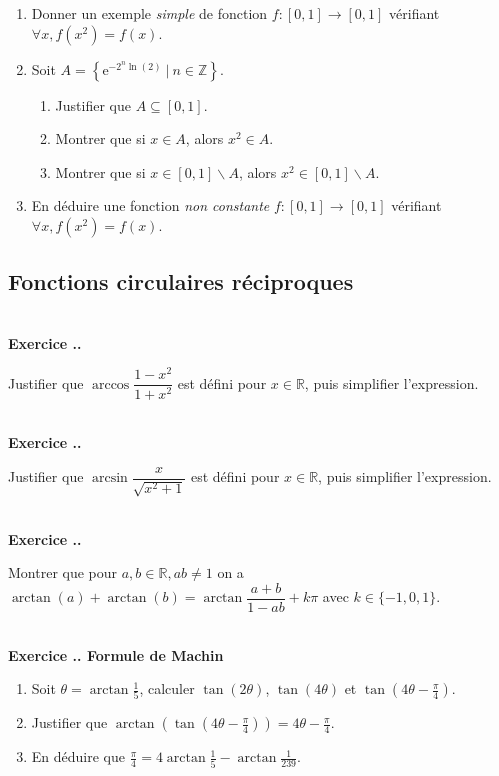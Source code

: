 \documentclass{article}
\newcommand{\mb}[1]{\mathbb{#1}}
\newcounter{exo}
\newcommand{\exercice}[1][\null]{\textbf{\\ Exercice \thesection.\theexo. #1} \addtocounter{exo}{1}}
\begin{document}
\begin{enumerate}

\item Donner un exemple \emph{simple} de fonction $f:[0,1] \rightarrow [0,1]$ vérifiant $\forall x, f(x^2) = f(x)$.
\item Soit $\displaystyle A = \left\{\text{e}^{-2^n\ln(2)}~\Big|~n \in \mb{Z}\right\}$.

\begin{enumerate}

\item Justifier que $A \subseteq[0,1]$.

\item Montrer que si $x \in A$, alors $x^2 \in A$.

\item Montrer que si $x \in [0,1]\smallsetminus A$, alors $x^2 \in [0,1]\smallsetminus A$.

\end{enumerate}

\item En déduire une fonction \emph{non constante} $f:[0,1] \rightarrow [0,1]$ vérifiant $\forall x, f(x^2) = f(x)$.
\end{enumerate}


        
\subsection{Fonctions circulaires réciproques}

\exercice

Justifier que $\arccos \dfrac{1-x^2}{1+x^2}$ est défini pour $x \in \mb{R}$, puis simplifier l'expression.

\exercice

Justifier que $\arcsin \dfrac{x}{\sqrt{x^2 +1}}$ est défini pour $x \in \mb{R}$, puis simplifier l'expression.




\exercice

Montrer que pour $a,b \in \mb{R}, ab \neq 1$ on a $\arctan(a) + \arctan(b) = \arctan \dfrac{a+b}{1-ab} + k \pi$ avec $k \in \{ -1, 0, 1 \}$.


\exercice[Formule de Machin]

\begin{enumerate} 

\item Soit $\theta = \arctan \frac{1}{5}$, calculer $\tan(2\theta)$, $\tan(4 \theta)$ et $\tan(4 \theta - \frac{\pi}{4})$.

\item Justifier que $\arctan(\tan(4 \theta-\frac{\pi}{4})) = 4 \theta-\frac{\pi}{4}$.

\item En déduire que $\displaystyle \frac{\pi}{4} = 4 \arctan\frac{1}{5} -  \arctan\frac{1}{239}$.

\end{enumerate}
\end{document}
